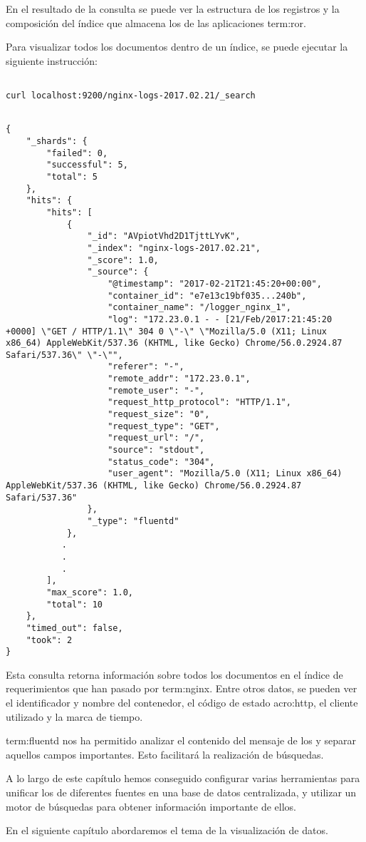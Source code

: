 En el resultado de la consulta se puede ver la estructura de los registros y la
composición del índice que almacena los  de las aplicaciones
\gls{term:ror}.

Para visualizar todos los documentos dentro de un índice, se puede ejecutar la
siguiente instrucción:

\begin{lstlisting}

curl localhost:9200/nginx-logs-2017.02.21/_search

\end{lstlisting}

\begin{lstlisting}

{
    "_shards": {
        "failed": 0,
        "successful": 5,
        "total": 5
    },
    "hits": {
        "hits": [
            {
                "_id": "AVpiotVhd2D1TjttLYvK",
                "_index": "nginx-logs-2017.02.21",
                "_score": 1.0,
                "_source": {
                    "@timestamp": "2017-02-21T21:45:20+00:00",
                    "container_id": "e7e13c19bf035...240b",
                    "container_name": "/logger_nginx_1",
                    "log": "172.23.0.1 - - [21/Feb/2017:21:45:20 +0000] \"GET / HTTP/1.1\" 304 0 \"-\" \"Mozilla/5.0 (X11; Linux x86_64) AppleWebKit/537.36 (KHTML, like Gecko) Chrome/56.0.2924.87 Safari/537.36\" \"-\"",
                    "referer": "-",
                    "remote_addr": "172.23.0.1",
                    "remote_user": "-",
                    "request_http_protocol": "HTTP/1.1",
                    "request_size": "0",
                    "request_type": "GET",
                    "request_url": "/",
                    "source": "stdout",
                    "status_code": "304",
                    "user_agent": "Mozilla/5.0 (X11; Linux x86_64) AppleWebKit/537.36 (KHTML, like Gecko) Chrome/56.0.2924.87 Safari/537.36"
                },
                "_type": "fluentd"
            },
           .
           .
           .
        ],
        "max_score": 1.0,
        "total": 10
    },
    "timed_out": false,
    "took": 2
}

\end{lstlisting}

Esta consulta retorna información sobre todos los documentos en el índice
de requerimientos  que han pasado por \gls{term:nginx}. Entre
otros datos, se pueden ver el identificador y nombre del contenedor, el código
de estado \gls{acro:http}, el cliente  utilizado y la marca de
tiempo.

\gls{term:fluentd} nos ha permitido analizar el contenido del mensaje de los
 y separar aquellos campos importantes. Esto facilitará la realización de
búsquedas.

A lo largo de este capítulo hemos conseguido configurar varias herramientas
para unificar los  de diferentes fuentes en una base de datos
centralizada, y utilizar un motor de búsquedas para obtener información
importante de ellos.

En el siguiente capítulo abordaremos el tema de la visualización de datos.
